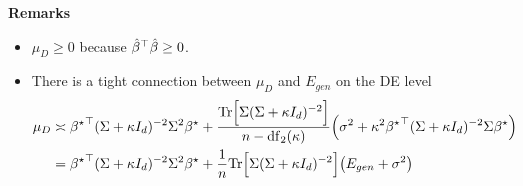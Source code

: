 \textbf{Remarks}
\begin{itemize}
\item $\mu_{D}\geq0$ because ${\hat{\beta}}^{\top}\hat{\beta}\geq0$.
\item There is a tight connection between $\mu_{D}$ and $E_{gen}$ on the
DE level
\begin{align*}
\mu_{D} & \asymp{{\beta^{\star}}}^{\top}(\Sigma+\kappa I_{d})^{-2}\Sigma^{2}{\beta^{\star}}+\frac{\mathrm{Tr}\Big[\Sigma(\Sigma+\kappa I_{d})^{-2}\Big]}{n-\mathrm{df}_{2}(\kappa)}\Big(\sigma^{2}+\kappa^{2}{{\beta^{\star}}}^{\top}(\Sigma+\kappa I_{d})^{-2}\Sigma{\beta^{\star}}\Big)\\
 & ={{\beta^{\star}}}^{\top}(\Sigma+\kappa I_{d})^{-2}\Sigma^{2}{\beta^{\star}}+\frac{1}{n}\mathrm{Tr}\Big[\Sigma(\Sigma+\kappa I_{d})^{-2}\Big]\big(E_{gen}+\sigma^{2}\big)
\end{align*}
\end{itemize}
